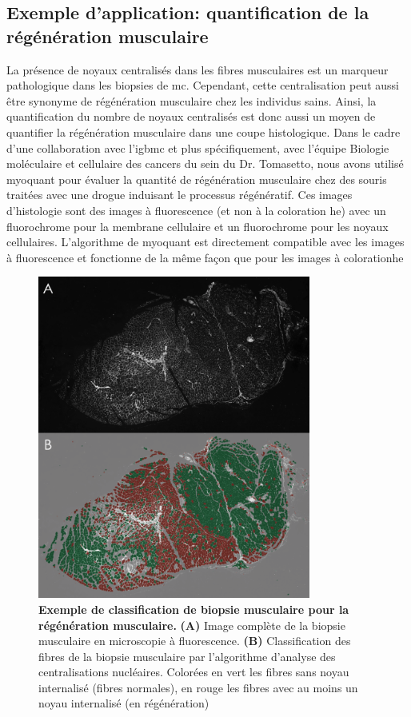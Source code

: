 \subsection{Exemple d'application: quantification de la régénération musculaire }
La présence de noyaux centralisés dans les fibres musculaires est un marqueur pathologique dans les biopsies de \gls{mc}. Cependant, cette centralisation peut aussi être synonyme de régénération musculaire chez les individus sains. Ainsi, la quantification du nombre de noyaux centralisés est donc aussi un moyen de quantifier la régénération musculaire dans une coupe histologique. Dans le cadre d'une collaboration avec l'\gls{igbmc} et plus spécifiquement, avec l'équipe Biologie moléculaire et cellulaire des cancers du sein du Dr. Tomasetto, nous avons utilisé \gls{myoquant} pour évaluer la quantité de régénération musculaire chez des souris traitées avec une drogue induisant le processus régénératif. Ces images d'histologie sont des images à fluorescence (et non à la coloration \gls{he}) avec un fluorochrome pour la membrane cellulaire et un fluorochrome pour les noyaux cellulaires. L'algorithme de \gls{myoquant} est directement compatible avec les images à fluorescence et fonctionne de la même façon que pour les images à coloration\gls{he}
\begin{figure}[!ht]
 \centering
 \includegraphics[width=0.8\textwidth]{figures/fluo_nuc.png}
 \caption[Exemple de classification de biopsie musculaire pour la régénération musculaire]{\textbf{Exemple de classification de biopsie musculaire pour la régénération musculaire.} \textbf{(A)} Image complète de la biopsie musculaire en microscopie à fluorescence.\textbf{ (B)} Classification des fibres de la biopsie musculaire par l'algorithme d'analyse des centralisations nucléaires. Colorées en vert les fibres sans noyau internalisé (fibres normales), en rouge les fibres avec au moins un noyau internalisé (en régénération)}
 \label{fig:fluo_paint}
\end{figure}

